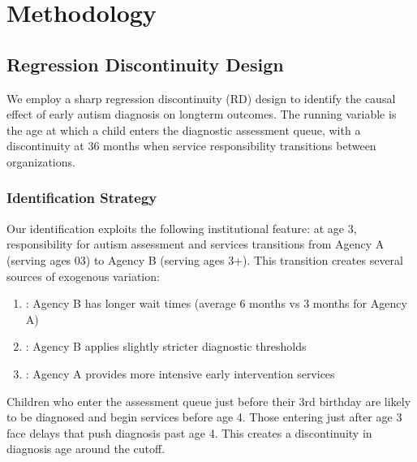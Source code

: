 \documentclass[letterpaper,10pt,english]{jupyterBook}
\begin{document}
\sphinxstepscope


\chapter{Methodology}
\label{\detokenize{methodology:methodology}}\label{\detokenize{methodology::doc}}

\section{Regression Discontinuity Design}
\label{\detokenize{methodology:regression-discontinuity-design}}
\sphinxAtStartPar
We employ a sharp regression discontinuity (RD) design to identify the causal effect of early autism diagnosis on long\sphinxhyphen{}term outcomes. The running variable is the age at which a child enters the diagnostic assessment queue, with a discontinuity at 36 months when service responsibility transitions between organizations.


\subsection{Identification Strategy}
\label{\detokenize{methodology:identification-strategy}}
\sphinxAtStartPar
Our identification exploits the following institutional feature: at age 3, responsibility for autism assessment and services transitions from Agency A (serving ages 0\sphinxhyphen{}3) to Agency B (serving ages 3+). This transition creates several sources of exogenous variation:
\begin{enumerate}
%
\item {} 
\sphinxAtStartPar
{}: Agency B has longer wait times (average 6 months vs 3 months for Agency A)

\item {} 
\sphinxAtStartPar
{}: Agency B applies slightly stricter diagnostic thresholds

\item {} 
\sphinxAtStartPar
{}: Agency A provides more intensive early intervention services

\end{enumerate}

\sphinxAtStartPar
Children who enter the assessment queue just before their 3rd birthday are likely to be diagnosed and begin services before age 4. Those entering just after age 3 face delays that push diagnosis past age 4. This creates a discontinuity in diagnosis age around the cutoff.
\end{document}
